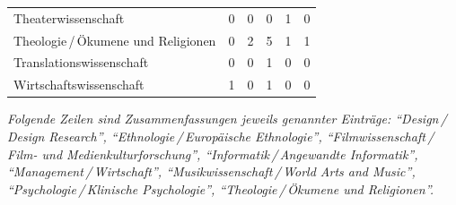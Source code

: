 \documentclass{scrartcl}
\begin{document}
\begin{landscape}
\begin{longtable}{L{7.5cm}ccccc}
      Theaterwissenschaft                                     & 0                     &  0                       &  0                       & 1                    & 0                       \\
      Theologie\,/\,Ökumene und Religionen                    & 0                     &  2                       &  5                       & 1                    & 1                       \\
      Translationswissenschaft                                & 0                     &  0                       &  1                       & 0                    & 0                       \\
      Wirtschaftswissenschaft                                 & 1                     &  0                       &  1                       & 0                    & 0                       \\
   \end{longtable}
   \noindent\textit{Folgende Zeilen sind Zusammenfassungen jeweils genannter Einträge:
   \enquote{Design\,/\,Design Research}, \enquote{Ethnologie\,/\,Europäische Ethnologie}, \enquote{Filmwissenschaft\,/\,Film- und Medienkulturforschung}, \enquote{Informatik\,/\,Angewandte Informatik}, \enquote{Management\,/\,Wirt\-schaft}, \enquote{Musikwissenschaft\,/\,World Arts and Music}, \enquote{Psychologie\,/\,Klinische Psychologie}, \enquote{Theologie\,/\,Ökumene und Religionen}.}


\end{landscape}
\end{document}
